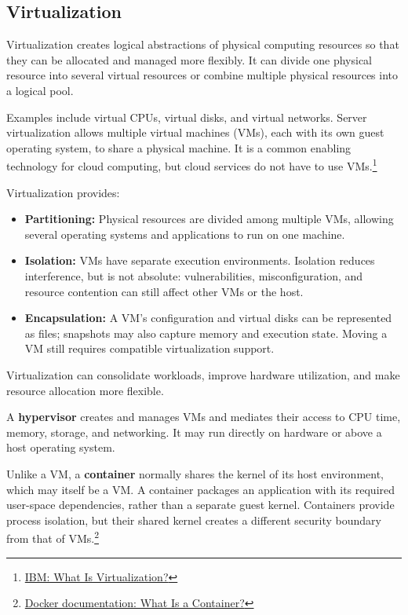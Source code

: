 \subsection{Virtualization}
Virtualization creates logical abstractions of physical computing resources so that they can be allocated and managed more flexibly. It can divide one physical resource into several virtual resources or combine multiple physical resources into a logical pool.

Examples include virtual CPUs, virtual disks, and virtual networks. Server virtualization allows multiple virtual machines (VMs), each with its own guest operating system, to share a physical machine. It is a common enabling technology for cloud computing, but cloud services do not have to use VMs.\footnote{\href{https://www.ibm.com/think/topics/virtualization}{IBM: What Is Virtualization?}}

Virtualization provides:

\begin{itemize}
  \item \textbf{Partitioning:} Physical resources are divided among multiple VMs, allowing several operating systems and applications to run on one machine.
  \item \textbf{Isolation:} VMs have separate execution environments. Isolation reduces interference, but is not absolute: vulnerabilities, misconfiguration, and resource contention can still affect other VMs or the host.
  \item \textbf{Encapsulation:} A VM's configuration and virtual disks can be represented as files; snapshots may also capture memory and execution state. Moving a VM still requires compatible virtualization support.
\end{itemize}

Virtualization can consolidate workloads, improve hardware utilization, and make resource allocation more flexible.

A \textbf{hypervisor} creates and manages VMs and mediates their access to CPU time, memory, storage, and networking. It may run directly on hardware or above a host operating system.

Unlike a VM, a \textbf{container} normally shares the kernel of its host environment, which may itself be a VM. A container packages an application with its required user-space dependencies, rather than a separate guest kernel. Containers provide process isolation, but their shared kernel creates a different security boundary from that of VMs.\footnote{\href{https://docs.docker.com/get-started/docker-concepts/the-basics/what-is-a-container/}{Docker documentation: What Is a Container?}}

